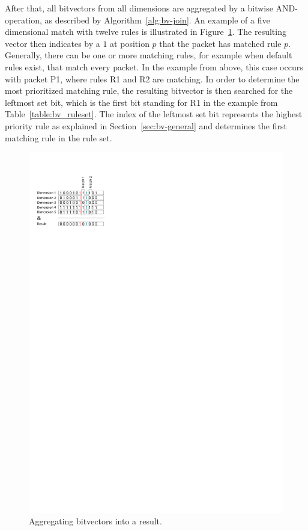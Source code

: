\documentclass[a4paper,
		12pt,
		parskip=full,
		titlepage
		]{scrartcl}
\begin{document}
After that, all bitvectors from all dimensions are aggregated by a bitwise AND-operation, as
described by Algorithm~\ref{alg:bv-join}.
An example of a five dimensional match with twelve rules is illustrated in Figure~\ref{fig:bv-and}.
The resulting vector then indicates by a $1$ at position $p$ that the packet has matched rule $p$.
Generally, there can be one or more matching rules, for example when default rules exist, that match every packet.
In the example from above, this case occurs with packet P1, where rules R1 and R2 are matching.
In order to determine the most prioritized matching rule, the resulting 
bitvector is then searched for the leftmost set bit, which is the first bit standing for R1 in the example from Table~\ref{table:bv_ruleset}.
The index of the leftmost set bit represents the highest priority rule as explained in Section~\ref{sec:bv-general}
and determines the first matching rule in the rule set.

\begin{figure}[H]
\centering
\includegraphics[height=0.3\textheight]{images/matching}
\caption{Aggregating bitvectors into a result.}
\label{fig:bv-and}
\end{figure}
\end{document}
